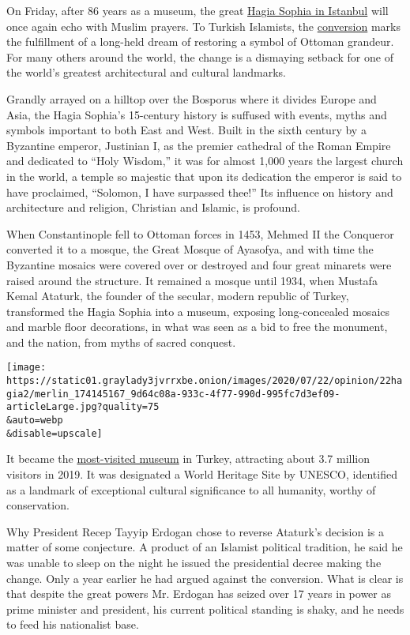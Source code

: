 On Friday, after 86 years as a museum, the great
\href{https://www.nytimes3xbfgragh.onion/2020/07/24/world/europe/turkey-hagia-sophia-mosque-prayers.html}{Hagia
Sophia in Istanbul} will once again echo with Muslim prayers. To Turkish
Islamists, the
\href{https://www.nytimes3xbfgragh.onion/2020/07/10/world/europe/hagia-sophia-erdogan.html}{conversion}
marks the fulfillment of a long-held dream of restoring a symbol of
Ottoman grandeur. For many others around the world, the change is a
dismaying setback for one of the world's greatest architectural and
cultural landmarks.

Grandly arrayed on a hilltop over the Bosporus where it divides Europe
and Asia, the Hagia Sophia's 15-century history is suffused with events,
myths and symbols important to both East and West. Built in the sixth
century by a Byzantine emperor, Justinian I, as the premier cathedral of
the Roman Empire and dedicated to ``Holy Wisdom,'' it was for almost
1,000 years the largest church in the world, a temple so majestic that
upon its dedication the emperor is said to have proclaimed, ``Solomon, I
have surpassed thee!'' Its influence on history and architecture and
religion, Christian and Islamic, is profound.

When Constantinople fell to Ottoman forces in 1453, Mehmed II the
Conqueror converted it to a mosque, the Great Mosque of Ayasofya, and
with time the Byzantine mosaics were covered over or destroyed and four
great minarets were raised around the structure. It remained a mosque
until 1934, when Mustafa Kemal Ataturk, the founder of the secular,
modern republic of Turkey, transformed the Hagia Sophia into a museum,
exposing long-concealed mosaics and marble floor decorations, in what
was seen as a bid to free the monument, and the nation, from myths of
sacred conquest.

\texttt{[image: https://static01.graylady3jvrrxbe.onion/images/2020/07/22/opinion/22hagia2/merlin\_174145167\_9d64c08a-933c-4f77-990d-995fc7d3ef09-articleLarge.jpg?quality=75\\\&auto=webp\\\&disable=upscale]}

It became the
\href{http://en.istanbul.gov.tr/the-most-visited-museums-of-turkey-hagia-sophia-museum}{most-visited
museum} in Turkey, attracting about 3.7 million visitors in 2019. It was
designated a World Heritage Site by UNESCO, identified as a landmark of
exceptional cultural significance to all humanity, worthy of
conservation.

Why President Recep Tayyip Erdogan chose to reverse Ataturk's decision
is a matter of some conjecture. A product of an Islamist political
tradition, he said he was unable to sleep on the night he issued the
presidential decree making the change. Only a year earlier he had argued
against the conversion. What is clear is that despite the great powers
Mr. Erdogan has seized over 17 years in power as prime minister and
president, his current political standing is shaky, and he needs to feed
his nationalist base.

